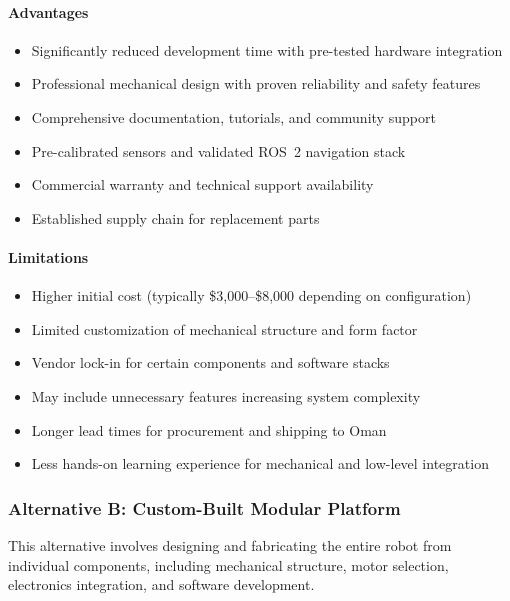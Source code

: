 \paragraph{Advantages}
\begin{itemize}
    \item Significantly reduced development time with pre-tested hardware integration
    \item Professional mechanical design with proven reliability and safety features
    \item Comprehensive documentation, tutorials, and community support
    \item Pre-calibrated sensors and validated ROS~2 navigation stack
    \item Commercial warranty and technical support availability
    \item Established supply chain for replacement parts
\end{itemize}

\paragraph{Limitations}
\begin{itemize}
    \item Higher initial cost (typically \$3,000--\$8,000 depending on configuration)
    \item Limited customization of mechanical structure and form factor
    \item Vendor lock-in for certain components and software stacks
    \item May include unnecessary features increasing system complexity
    \item Longer lead times for procurement and shipping to Oman
    \item Less hands-on learning experience for mechanical and low-level integration
\end{itemize}

\subsubsection{Alternative B: Custom-Built Modular Platform}
This alternative involves designing and fabricating the entire robot from individual components, including mechanical structure, motor selection, electronics integration, and software development.

